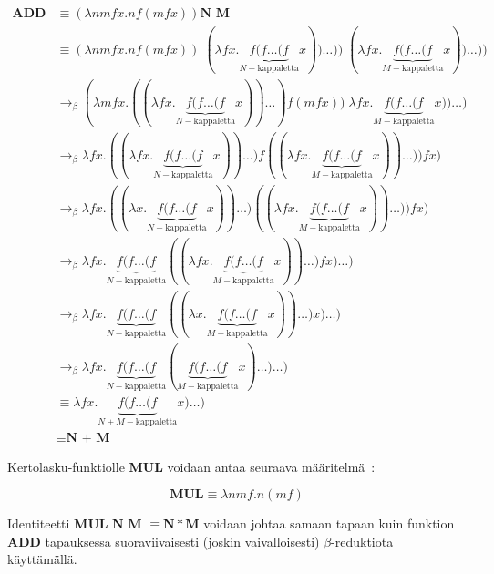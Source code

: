 \begin{esim}
\begin{align*} \textbf{ADD N M} &\equiv (\lambda nmfx . n f (m f x)) \textbf{N M} \\ 
&\equiv  (\lambda nmfx . n f (m f x)) \; (\lambda fx . \underbrace{ f ( f \ldots (f }_{ N-\text{kappaletta}} x)) \ldots )) \; (\lambda fx . \underbrace{ f ( f \ldots (f }_{ M-\text{kappaletta}} x)) \ldots ))\\ 
&\rightarrow_{\beta} (\lambda mfx . ((\lambda fx . \underbrace{ f ( f \ldots (f }_{ N-\text{kappaletta}} x)) \ldots ) f (m f x)) \; \lambda fx . \underbrace{ f ( f \ldots (f }_{ M-\text{kappaletta}} x)) \ldots )\\ 
&\rightarrow_{\beta} \lambda fx . ((\lambda fx . \underbrace{ f ( f \ldots (f }_{ N-\text{kappaletta}} x)) \ldots ) f ( (\lambda fx . \underbrace{ f ( f \ldots (f }_{ M-\text{kappaletta}} x)) \ldots )) f x ) \\
&\rightarrow_{\beta} \lambda fx . ((\lambda x . \underbrace{ f ( f \ldots (f }_{ N-\text{kappaletta}} x)) \ldots ) ( (\lambda fx . \underbrace{ f ( f \ldots (f }_{ M-\text{kappaletta}} x)) \ldots )) f x ) \\
&\rightarrow_{\beta}  \lambda fx . \underbrace{ f ( f \ldots (f }_{ N-\text{kappaletta}} ( (\lambda fx . \underbrace{ f ( f \ldots (f }_{ M-\text{kappaletta}} x)) \ldots ) f x ) \ldots )\\
&\rightarrow_{\beta}  \lambda fx . \underbrace{ f ( f \ldots (f }_{ N-\text{kappaletta}} ( (\lambda x . \underbrace{ f ( f \ldots (f }_{ M-\text{kappaletta}} x)) \ldots )  x ) \ldots) \\
&\rightarrow_{\beta}  \lambda fx . \underbrace{ f ( f \ldots (f }_{ N-\text{kappaletta}} (\underbrace{ f ( f \ldots (f }_{ M-\text{kappaletta}} x) \ldots ) \ldots ) \\
&\equiv \lambda fx . \underbrace{ f ( f \ldots (f }_{ N + M-\text{kappaletta}} x) \ldots ) \\
&\equiv \textbf{N + M}  
\end{align*}

Kertolasku-funktiolle \textbf{MUL} voidaan antaa seuraava määritelmä~\cite[s.~20]{Sel2013}:

\[ \textbf{MUL} \equiv \lambda n m f . n (mf) \]

Identiteetti $\textbf{MUL N M } \equiv \textbf{N} * \textbf{M}$ voidaan johtaa samaan tapaan kuin funktion \textbf{ADD} tapauksessa suoraviivaisesti (joskin vaivalloisesti) $\beta$-reduktiota käyttämällä. 

\par


\end{esim}
